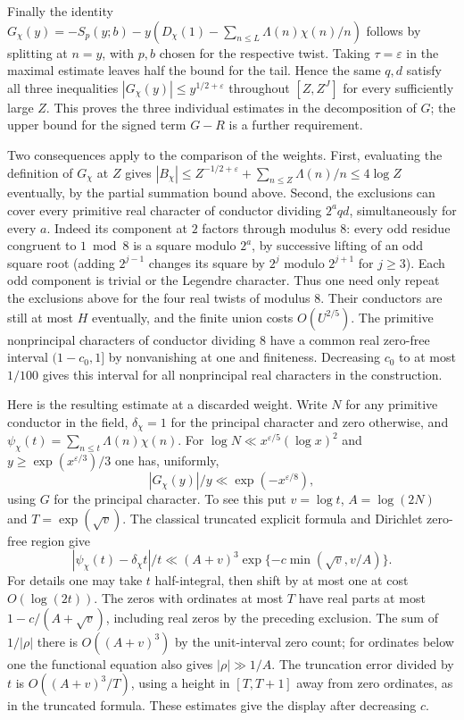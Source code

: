 \documentclass[11pt]{amsart}
\theoremstyle{definition}
\theoremstyle{remark}
\begin{document}
Finally the identity $G_\chi(y)=-S_p(y;b)
-y(D_\chi(1)-\sum_{n\le L}\Lambda(n)\chi(n)/n)$ follows by
splitting at $n=y$, with $p,b$ chosen for the respective twist.
Taking $\tau=\varepsilon$ in the maximal estimate leaves half the
bound for the tail. Hence the same $q,d$ satisfy all three
inequalities $|G_\chi(y)|\le y^{1/2+\varepsilon}$ throughout
$[Z,Z^J]$ for every sufficiently large $Z$. This proves the
three individual estimates in the decomposition of $G$; the
upper bound for the signed term $G-R$ is a further requirement.

Two consequences apply to the comparison of the weights. First,
evaluating the definition of $G_\chi$ at $Z$ gives
$|B_\chi|\le Z^{-1/2+\varepsilon}+\sum_{n\le Z}\Lambda(n)/n
\le 4\log Z$ eventually, by the partial summation bound above.
Second, the exclusions can cover every primitive real character of
conductor dividing $2^a qd$, simultaneously for every $a$. Indeed
its component at $2$ factors through modulus $8$: every odd residue
congruent to $1\bmod8$ is a square modulo $2^a$, by successive
lifting of an odd square root (adding $2^{j-1}$ changes its square
by $2^j$ modulo $2^{j+1}$ for $j\ge3$). Each odd component is
trivial or the Legendre character. Thus one need only repeat the
exclusions above for the four real twists of modulus $8$. Their
conductors are still at most $H$ eventually, and the finite union
costs $O(U^{2/5})$. The primitive nonprincipal characters of
conductor dividing $8$ have a common real zero-free interval
$(1-c_0,1]$ by nonvanishing at one and finiteness. Decreasing
$c_0$ to at most $1/100$ gives this interval for all nonprincipal
real characters in the construction.

Here is the resulting estimate at a discarded weight. Write
$N$ for any primitive conductor in the field, $\delta_\chi=1$
for the principal character and zero otherwise, and
$\psi_\chi(t)=\sum_{n\le t}\Lambda(n)\chi(n)$. For
$\log N\ll x^{\varepsilon/5}(\log x)^2$ and
$y\ge\exp(x^{\varepsilon/3})/3$ one has, uniformly,
\[
 |G_\chi(y)|/y\ll \exp(-x^{\varepsilon/8}),
\]
using $G$ for the principal character. To see this put $v=\log t$,
$A=\log(2N)$ and $T=\exp(\sqrt v)$. The classical truncated
explicit formula and Dirichlet zero-free region \cite{IK} give
\[
 |\psi_\chi(t)-\delta_\chi t|/t
 \ll (A+v)^3\exp\{-c\min(\sqrt v,v/A)\}.
\]
For details one may take $t$ half-integral, then shift by at most
one at cost $O(\log(2t))$. The zeros with ordinates at most $T$
have real parts at most $1-c/(A+\sqrt v)$, including real zeros
by the preceding exclusion. The sum of $1/|\rho|$ there is
$O((A+v)^3)$ by the unit-interval zero count; for ordinates below
one the functional equation also gives $|\rho|\gg 1/A$.
The truncation error divided by $t$ is
$O((A+v)^3/T)$, using a height in $[T,T+1]$ away from zero
ordinates, as in the truncated formula. These estimates give the
display after decreasing $c$.
\end{document}

